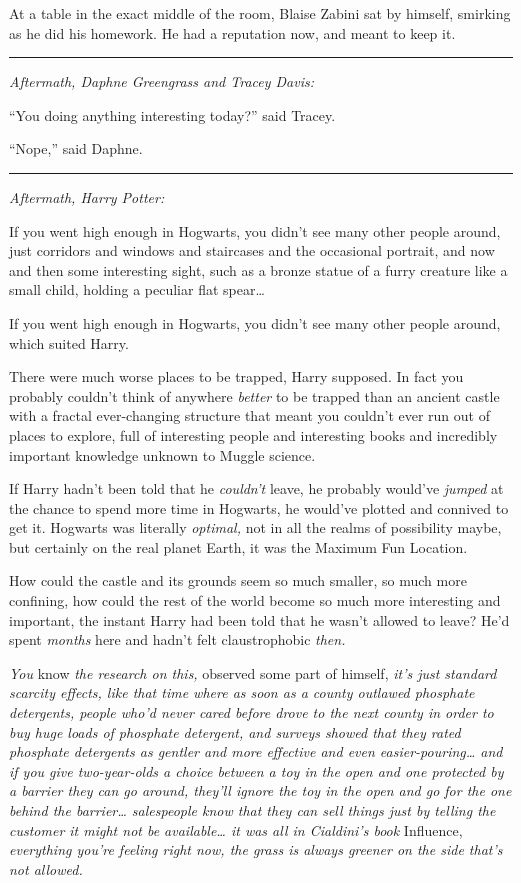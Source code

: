 At a table in the exact middle of the room, Blaise Zabini sat by
himself, smirking as he did his homework. He had a reputation now, and
meant to keep it.

\begin{center}\rule{3in}{0.4pt}\end{center}

\emph{Aftermath, Daphne Greengrass and Tracey Davis:}

``You doing anything interesting today?'' said Tracey.

``Nope,'' said Daphne.

\begin{center}\rule{3in}{0.4pt}\end{center}

\emph{Aftermath, Harry Potter:}

If you went high enough in Hogwarts, you didn't see many other people
around, just corridors and windows and staircases and the occasional
portrait, and now and then some interesting sight, such as a bronze
statue of a furry creature like a small child, holding a peculiar flat
spear\ldots{}

If you went high enough in Hogwarts, you didn't see many other people
around, which suited Harry.

There were much worse places to be trapped, Harry supposed. In fact you
probably couldn't think of anywhere \emph{better} to be trapped than an
ancient castle with a fractal ever-changing structure that meant you
couldn't ever run out of places to explore, full of interesting people
and interesting books and incredibly important knowledge unknown to
Muggle science.

If Harry hadn't been told that he \emph{couldn't} leave, he probably
would've \emph{jumped} at the chance to spend more time in Hogwarts, he
would've plotted and connived to get it. Hogwarts was literally
\emph{optimal,} not in all the realms of possibility maybe, but
certainly on the real planet Earth, it was the Maximum Fun Location.

How could the castle and its grounds seem so much smaller, so much more
confining, how could the rest of the world become so much more
interesting and important, the instant Harry had been told that he
wasn't allowed to leave? He'd spent \emph{months} here and hadn't felt
claustrophobic \emph{then.}

\emph{You} know \emph{the research on this,} observed some part of
himself, \emph{it's just standard scarcity effects, like that time where
as soon as a county outlawed phosphate detergents, people who'd never
cared before drove to the next county in order to buy huge loads of
phosphate detergent, and surveys showed that they rated phosphate
detergents as gentler and more effective and even easier-pouring\ldots{}
and if you give two-year-olds a choice between a toy in the open and one
protected by a barrier they can go around, they'll ignore the toy in the
open and go for the one behind the barrier\ldots{} salespeople know that
they can sell things just by telling the customer it might not be
available\ldots{} it was all in Cialdini's book} Influence,
\emph{everything you're feeling right now, the grass is always greener
on the side that's not allowed.}

